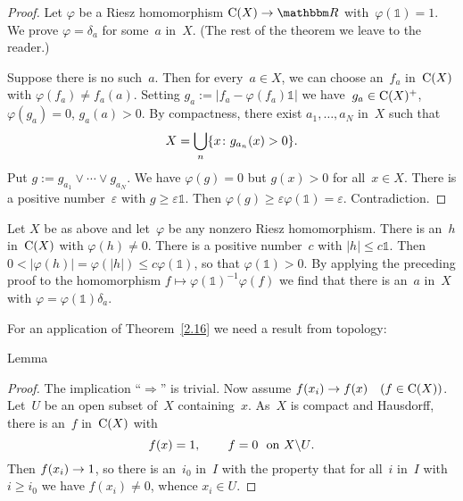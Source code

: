 \documentclass[main.tex]{subfiles}
\begin{document}
\begin{proof}
Let $\varphi$ be a Riesz homomorphism $\Cont{X}\ra \R$
with~$\varphi(\mathbb{1})=1$.
We prove $\varphi=\delta_a$ for some~$a$ in~$X$.
(The rest of the theorem 
we leave to the reader.)

Suppose there is no such~$a$.
Then for every~$a\in X$,
we can choose an~$f_a$ in~$\mathrm{C}(X)$
with $\varphi(f_a)\neq f_a(a)$.
Setting $g_a := | f_a - \varphi(f_a) \mathbb{1}|$
we have~$g_a \in \mathrm{C}(X)^+$,
$\varphi(g_a)=0$,
$g_a(a)>0$.
By compactness,
there exist $a_1,\dotsc,a_N$ in~$X$ such that
\begin{equation*}
X = \bigcup_n \{ x\colon g_{a_n} (x) > 0 \}\text{.}
\end{equation*}
Put $g:=g_{a_1}\vee \dotsb \vee g_{a_N}$.
We have $\varphi(g) =0$ 
but $g(x)>0$ for all~$x\in X$.
There is a positive number~$\varepsilon$
with $g\geq \varepsilon \mathbb{1}$.
Then $\varphi(g)\geq \varepsilon \varphi(\mathbb{1})=\varepsilon$.
Contradiction. \xqed
\end{proof}
%
%
\begin{psec}{2.17}%
Let $X$ be as above 
and let~$\varphi$ be any nonzero Riesz homomorphism.
There is an~$h$ in~$\mathrm{C}(X)$
with $\varphi(h)\neq 0$.
There is a positive number~$c$
with $|h|\leq c\mathbb{1}$.
Then $0<|\varphi(h)|=\varphi(|h|)\leq c\varphi(\mathbb{1})$,
so that $\varphi(\mathbb{1})>0$.
By applying the preceding proof to
the homomorphism $f\mapsto \varphi(\mathbb{1})^{-1} \varphi(f)$
we find that there is an~$a$ in~$X$ 
with $\varphi = \varphi(\mathbb{1})\delta_a$.
\end{psec}
%
%
For an application of Theorem~\ref{2.16}
we need a result from topology:
\begin{psec}{2.18}{Lemma}
\end{psec}
\begin{proof}
The implication ``$\Rightarrow$'' is trivial.
Now assume $f(x_i)\rightarrow f(x)\quad (f\in \mathrm{C}(X))$.
Let~$U$ be an open subset of~$X$ containing~$x$.
As~$X$ is compact and Hausdorff,
there is an~$f$ in~$\mathrm{C}(X)$ with
\begin{equation*}
f(x)=1\text{, } 
\qquad f=0\ \text{ on }X\backslash U
\text{.}
\end{equation*}
Then $f(x_i)\rightarrow 1$, 
so there is an~$i_0$ in~$I$ with the property
that for all~$i$ in~$I$ with $i\ge i_0$
we have $f(x_i)\neq 0$, whence $x_i \in U$. \xqed
\end{proof}
\end{document}
